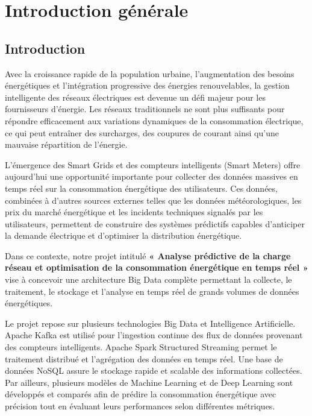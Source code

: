 \documentclass[12pt,a4paper]{report}
\begin{document}
\chapter{Introduction générale}

\section{Introduction}

Avec la croissance rapide de la population urbaine, l’augmentation des besoins énergétiques et l’intégration progressive des énergies renouvelables, la gestion intelligente des réseaux électriques est devenue un défi majeur pour les fournisseurs d’énergie. Les réseaux traditionnels ne sont plus suffisants pour répondre efficacement aux variations dynamiques de la consommation électrique, ce qui peut entraîner des surcharges, des coupures de courant ainsi qu’une mauvaise répartition de l’énergie.

L’émergence des Smart Grids et des compteurs intelligents (Smart Meters) offre aujourd’hui une opportunité importante pour collecter des données massives en temps réel sur la consommation énergétique des utilisateurs. Ces données, combinées à d’autres sources externes telles que les données météorologiques, les prix du marché énergétique et les incidents techniques signalés par les utilisateurs, permettent de construire des systèmes prédictifs capables d’anticiper la demande électrique et d’optimiser la distribution énergétique.

Dans ce contexte, notre projet intitulé \textbf{« Analyse prédictive de la charge réseau et optimisation de la consommation énergétique en temps réel »} vise à concevoir une architecture Big Data complète permettant la collecte, le traitement, le stockage et l’analyse en temps réel de grands volumes de données énergétiques.

Le projet repose sur plusieurs technologies Big Data et Intelligence Artificielle. Apache Kafka est utilisé pour l’ingestion continue des flux de données provenant des compteurs intelligents. Apache Spark Structured Streaming permet le traitement distribué et l’agrégation des données en temps réel. Une base de données NoSQL assure le stockage rapide et scalable des informations collectées. Par ailleurs, plusieurs modèles de Machine Learning et de Deep Learning sont développés et comparés afin de prédire la consommation énergétique avec précision tout en évaluant leurs performances selon différentes métriques.
\end{document}
